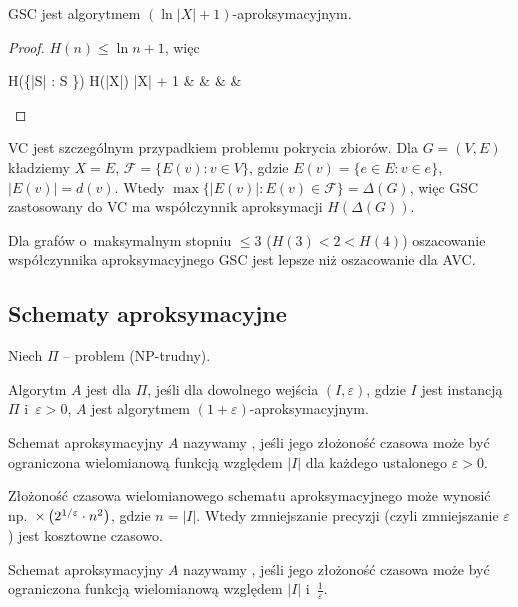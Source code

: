 \begin{obowiazkowy}
\begin{conclusion}
	GSC jest algorytmem $(\ln|X| + 1)$-aproksymacyjnym.
\end{conclusion}
\begin{proof}
	$H(n) \leq \ln n + 1$, więc
	\begin{flalign*}
		H(\max\{|S| : S \in {}\}) \leq H(|X|) \leq \ln|X| + 1 &  &  &  &
	\end{flalign*}
\end{proof}
\end{obowiazkowy}

VC jest szczególnym przypadkiem problemu pokrycia zbiorów. Dla $G = (V, E)$ kładziemy $X = E$, $\mathcal{F} = \{E(v) : v \in V\}$, gdzie $E(v) = \{e \in E : v \in e\}$, $|E(v)| = d(v)$. Wtedy $\max\{|E(v)| : E(v) \in \mathcal{F}\} = \Delta(G)$, więc GSC zastosowany do VC ma współczynnik aproksymacji $H(\Delta(G))$.

Dla grafów o~maksymalnym stopniu $\leq 3$ ($H(3) < 2 < H(4)$) oszacowanie współczynnika aproksymacyjnego GSC jest lepsze niż oszacowanie dla AVC.

\subsection{Schematy aproksymacyjne}

Niech $\Pi$ -- problem (NP-trudny).

\begin{definition}
	Algorytm $A$ jest  dla $\Pi$, jeśli dla dowolnego wejścia $(I, \varepsilon)$, gdzie $I$ jest instancją $\Pi$ i~$\varepsilon > 0$, $A$ jest algorytmem $(1 + \varepsilon)$-aproksymacyjnym.
\end{definition}

\begin{definition}
	Schemat aproksymacyjny $A$ nazywamy , jeśli jego złożoność czasowa może być ograniczona wielomianową funkcją względem $|I|$ dla każdego ustalonego $\varepsilon > 0$.
\end{definition}

Złożoność czasowa wielomianowego schematu aproksymacyjnego może wynosić np.\ $\mathcal{\Theta}\left(2^{1/\varepsilon} \cdot n^2\right)$, gdzie $n = |I|$. Wtedy zmniejszanie precyzji (czyli zmniejszanie $\varepsilon$) jest kosztowne czasowo.

\begin{definition}
	Schemat aproksymacyjny $A$ nazywamy , jeśli jego złożoność czasowa może być ograniczona funkcją wielomianową względem $|I|$ i~$\frac{1}{\varepsilon}$.
\end{definition}
